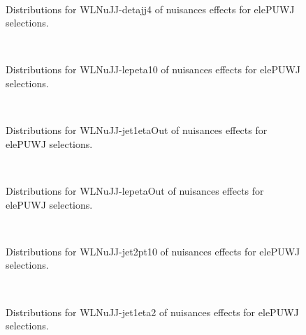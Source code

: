 \begin{figure}[htbp]  
\centering 
\\ 
\caption{ 
   Distributions for WLNuJJ-detajj4 of nuisances effects for elePUWJ selections.
} 
\label{fig:WLNuJJ_detajj4_elePUWJ} 
\end{figure} 




\begin{figure}[htbp]  
\centering 
\\ 
\caption{ 
   Distributions for WLNuJJ-lepeta10 of nuisances effects for elePUWJ selections.
} 
\label{fig:WLNuJJ_lepeta10_elePUWJ} 
\end{figure} 




\begin{figure}[htbp]  
\centering 
\\ 
\caption{ 
   Distributions for WLNuJJ-jet1etaOut of nuisances effects for elePUWJ selections.
} 
\label{fig:WLNuJJ_jet1etaOut_elePUWJ} 
\end{figure} 




\begin{figure}[htbp]  
\centering 
\\ 
\caption{ 
   Distributions for WLNuJJ-lepetaOut of nuisances effects for elePUWJ selections.
} 
\label{fig:WLNuJJ_lepetaOut_elePUWJ} 
\end{figure} 




\begin{figure}[htbp]  
\centering 
\\ 
\caption{ 
   Distributions for WLNuJJ-jet2pt10 of nuisances effects for elePUWJ selections.
} 
\label{fig:WLNuJJ_jet2pt10_elePUWJ} 
\end{figure} 




\begin{figure}[htbp]  
\centering 
\\ 
\caption{ 
   Distributions for WLNuJJ-jet1eta2 of nuisances effects for elePUWJ selections.
} 
\label{fig:WLNuJJ_jet1eta2_elePUWJ} 
\end{figure} 




